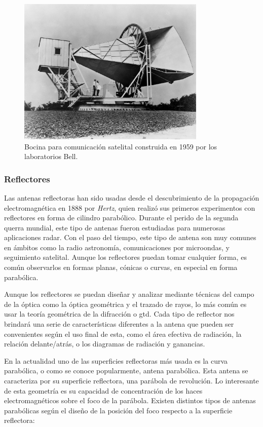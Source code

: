 \begin{figure}[h]
    \centering
        \includegraphics[width=0.8\textwidth]{archivos/horn}
        \caption{Bocina para comunicación satelital construida en 1959 por los laboratorios Bell. \citep{NASA1962}}
        \label{fig:horn}
\end{figure}

\subsubsection{Reflectores}

\par Las antenas reflectoras han sido usadas desde el descubrimiento de la propagación electromagnética en 1888 por \textit{Hertz}, quien realizó sus primeros experimentos con reflectores en forma de cilindro parabólico. Durante el perido de la segunda querra mundial, este tipo de antenas fueron estudiadas para numerosas aplicaciones radar. Con el paso del tiempo, este tipo de antena son muy comunes en ámbitos como la radio astronomía, comunicaciones por microondas, y seguimiento satelital. Aunque los reflectores puedan tomar cualquier forma, es común observarlos en formas planas, cónicas o curvas, en especial en forma parabólica. 
\\
\par Aunque los reflectores se puedan diseñar y analizar mediante técnicas del campo de la óptica como la óptica geométrica y el trazado de rayos, lo más común es usar la teoría geométrica de la difracción o \gls{gtd}. Cada tipo de reflector nos brindará una serie de características diferentes a la antena que pueden ser convenientes según el uso final de esta, como el área efectiva de radiación, la relación delante/atrás, o los diagramas de radiación y ganancias.
\\
\par En la actualidad uno de las superficies reflectoras más usada es la curva parabólica, o como se conoce popularmente, antena parabólica. Esta antena se caracteriza por su superficie reflectora, una parábola de revolución. Lo interesante de esta geometría es su capacidad de concentración de los haces electromagnéticos sobre el foco de la parábola. Existen distintos tipos de antenas parabólicas según el diseño de la posición del foco respecto a la superficie reflectora:

